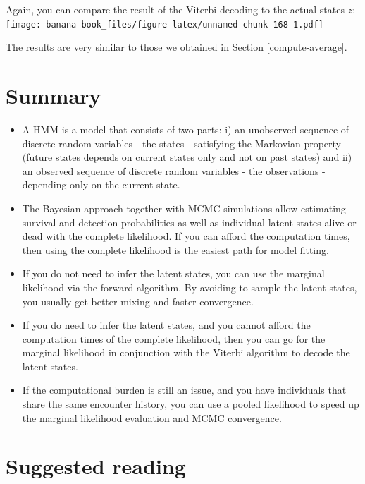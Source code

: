 \documentclass[
  12pt,
]{krantz}
\begin{document}
Again, you can compare the result of the Viterbi decoding to the actual states \(z\):
\texttt{[image: banana-book\_files/figure-latex/unnamed-chunk-168-1.pdf]}

The results are very similar to those we obtained in Section \ref{compute-average}.

\hypertarget{summary-2}{%
\section{Summary}\label{summary-2}}

\begin{itemize}
\item
  A HMM is a model that consists of two parts: i) an unobserved sequence of discrete random variables - the states - satisfying the Markovian property (future states depends on current states only and not on past states) and ii) an observed sequence of discrete random variables - the observations - depending only on the current state.
\item
  The Bayesian approach together with MCMC simulations allow estimating survival and detection probabilities as well as individual latent states alive or dead with the complete likelihood. If you can afford the computation times, then using the complete likelihood is the easiest path for model fitting.
\item
  If you do not need to infer the latent states, you can use the marginal likelihood via the forward algorithm. By avoiding to sample the latent states, you usually get better mixing and faster convergence.
\item
  If you do need to infer the latent states, and you cannot afford the computation times of the complete likelihood, then you can go for the marginal likelihood in conjunction with the Viterbi algorithm to decode the latent states.
\item
  If the computational burden is still an issue, and you have individuals that share the same encounter history, you can use a pooled likelihood to speed up the marginal likelihood evaluation and MCMC convergence.
\end{itemize}

\hypertarget{suggested-reading-2}{%
\section{Suggested reading}\label{suggested-reading-2}}
\end{document}
